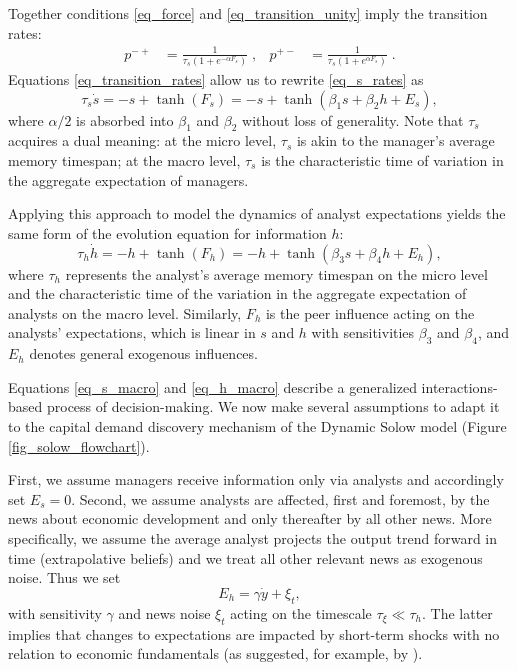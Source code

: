 \documentclass[authoryear, review]{elsarticle}
\begin{document}
Together conditions \eqref{eq_force} and \eqref{eq_transition_unity} imply the transition rates:
\begin{align}\label{eq_transition_rates}
p^{-+} &= \frac{1}{\tau_s\left(1+e^{-\alpha F_s}\right)}\; , & p^{+-} &= \frac{1}{\tau_s\left(1+e^{\alpha F_s}\right)}\; .
\end{align}
Equations \eqref{eq_transition_rates} allow us to rewrite \eqref{eq_s_rates} as
\begin{equation}\label{eq_s_macro}
\tau_s\dot{s} = -s + \tanh\left(F_s\right) = -s + \tanh\left(\beta_1 s + \beta_2 h + E_s\right),
\end{equation}
where ${\alpha}/{2}$ is absorbed into $\beta_1$ and $\beta_2$ without loss of generality. Note that $\tau_s$ acquires a dual meaning: at the micro level, $\tau_s$ is akin to the manager's average memory timespan; at the macro level, $\tau_s$ is the characteristic time of variation in the aggregate expectation of managers.

Applying this approach to model the dynamics of analyst expectations yields the same form of the evolution equation for information $h$: 
\begin{equation}\label{eq_h_macro}
\tau_h\dot{h} = -h + \tanh\left(F_h\right) = -h + \tanh\left(\beta_3 s + \beta_4 h + E_h\right),
\end{equation}
where $\tau_h$ represents the analyst's average memory timespan on the micro level and the characteristic time of the variation in the aggregate expectation of analysts on the macro level. Similarly, $F_h$ is the peer influence acting on the analysts' expectations, which is linear in $s$ and $h$ with sensitivities $\beta_3$ and $\beta_4$, and $E_h$ denotes general exogenous influences.

Equations \eqref{eq_s_macro} and \eqref{eq_h_macro} describe a generalized interactions-based process of decision-making. We now make several assumptions to adapt it to the capital demand discovery mechanism of the Dynamic Solow model (Figure \ref{fig_solow_flowchart}). 

First, we assume managers receive information only via analysts and accordingly set $E_s=0$. Second, we assume analysts are affected, first and foremost, by the news about economic development and only thereafter by all other news. More specifically, we assume the average analyst projects the output trend forward in time (extrapolative beliefs) and we treat all other relevant news as exogenous noise. Thus we set \begin{equation}E_h=\gamma\dot{y} + \xi_t,
\end{equation}
with sensitivity $\gamma$ and news noise $\xi_t$ acting on the timescale $\tau_\xi\ll\tau_h$. The latter implies that changes to expectations are impacted by short-term shocks with no relation to economic fundamentals (as suggested, for example, by \citet{AngeletosEtAl2020}).
\end{document}
